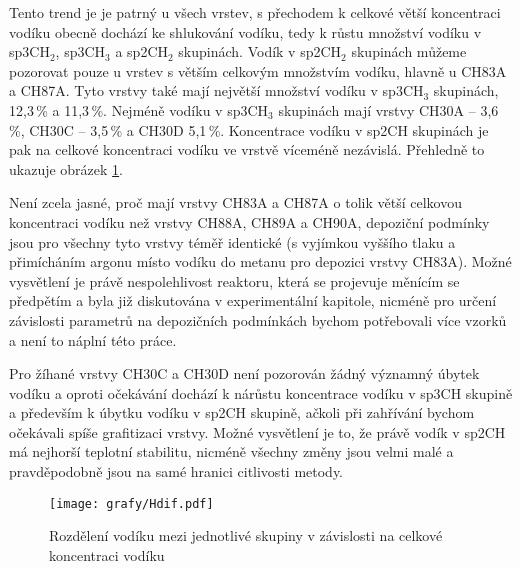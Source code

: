 Tento trend je je patrný u všech vrstev, s přechodem k celkové větší koncentraci vodíku obecně dochází ke shlukování vodíku, tedy k růstu množství vodíku v sp3CH$_2$, sp3CH$_3$ a sp2CH$_2$ skupinách. Vodík v sp2CH$_2$ skupinách můžeme pozorovat pouze u vrstev s větším celkovým množstvím vodíku, hlavně u CH83A a CH87A. Tyto vrstvy také mají největší množství vodíku v sp3CH$_3$ skupinách, 12,3\,\% a 11,3\,\%. Nejméně vodíku v sp3CH$_3$ skupinách mají vrstvy CH30A -- 3,6\,\%, CH30C -- 3,5\,\% a CH30D 5,1\,\%. Koncentrace vodíku v sp2CH skupinách je pak na celkové koncentraci vodíku ve vrstvě víceméně nezávislá. Přehledně to ukazuje obrázek \ref{Hdif}.

Není zcela jasné, proč mají vrstvy CH83A a CH87A o tolik větší celkovou koncentraci vodíku než vrstvy CH88A, CH89A a CH90A, depoziční podmínky jsou pro všechny tyto vrstvy téměř identické (s vyjímkou vyššího tlaku a přimícháním argonu místo vodíku do metanu pro depozici vrstvy CH83A). 
Možné vysvětlení je právě nespolehlivost reaktoru, která se projevuje měnícím se předpětím a byla již diskutována v experimentální kapitole, nicméně pro určení závislosti parametrů na depozičních podmínkách bychom potřebovali více vzorků a není to náplní této práce.

Pro žíhané vrstvy CH30C a CH30D není pozorován žádný významný úbytek vodíku a oproti očekávání dochází k nárůstu koncentrace vodíku v sp3CH skupině a především k úbytku vodíku v sp2CH skupině, ačkoli při zahřívání bychom očekávali spíše grafitizaci vrstvy. Možné vysvětlení je to, že právě vodík v sp2CH má nejhorší teplotní stabilitu, nicméně všechny změny jsou velmi malé a pravděpodobně jsou na samé hranici citlivosti metody.

\begin{figure}[tbhp]
	\texttt{[image: grafy/Hdif.pdf]}
	\caption{Rozdělení vodíku mezi jednotlivé skupiny v závislosti na celkové koncentraci vodíku}
	\label{Hdif}
\end{figure}

